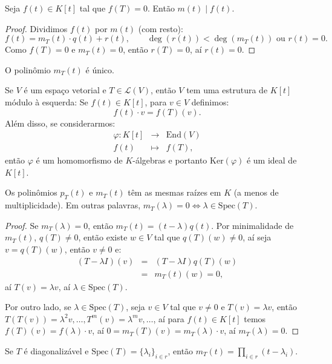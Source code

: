 \documentclass[11pt,twoside,a4paper]{book}
\begin{document}
\begin{lema}
Seja $f(t)\in K[t]$ tal que $f(T)=0$. Então $m(t)\mid f(t)$.
\end{lema}
\begin{proof}
Dividimos $f(t)$ por $m(t)$ (com resto):
\[
f(t)=m_T(t)\cdot q(t)+r(t),\quad\quad\deg(r(t))<\deg(m_T(t))\text{ ou }r(t)=0.
\]
Como $f(T)=0$ e $m_T(t)=0$, então $r(T)=0$, aí $r(t)=0$.
\end{proof}

\begin{corolario}
O polinômio $m_T(t)$ é único.
\end{corolario}

\noindent
Se $V$ é um espaço vetorial e $T\in\mathcal{L}(V)$, então $V$ tem uma estrutura de $K[t]$ módulo à esquerda: Se $f(t)\in K[t]$, para $v\in V$ definimos:
\[
f(t)\cdot v=f(T)(v).
\]
Além disso, se considerarmos:
\[
\begin{array}{rcl}
\varphi:K[t]&\rightarrow&\mathrm{End}(V)\\f(t)&\mapsto&f(T),
\end{array}
\]
então $\varphi$ é um homomorfismo de $K$-álgebras e portanto $\mathrm{Ker}(\varphi)$ é um ideal de $K[t]$.

\begin{teorema}
Os polinômios $p_T(t)$ e $m_T(t)$ têm as mesmas raízes em $K$ (a menos de multiplicidade). Em outras palavras, $m_T(\lambda)=0\Leftrightarrow\lambda\in\mathrm{Spec}(T)$.
\end{teorema}
\begin{proof}
Se $m_T(\lambda)=0$, então $m_T(t)=(t-\lambda)q(t)$. Por minimalidade de $m_T(t)$, $q(T)\neq 0$, então existe $w\in V$ tal que $q(T)(w)\neq 0$, aí seja $v=q(T)(w)$, então $v\neq 0$ e:
\[
\begin{array}{rcl}
(T-\lambda I)(v)&=&(T-\lambda I)q(T)(w)\\&=&m_T(t)(w)=0,
\end{array}
\]
aí $T(v)=\lambda v$, aí $\lambda\in\mathrm{Spec}(T)$.

\medskip
\noindent
Por outro lado, se $\lambda\in\mathrm{Spec}(T)$, seja $v\in V$ tal que $v\neq 0$ e $T(v)=\lambda v$, então $T(T(v))=\lambda^2 v,\dots,T^m(v)=\lambda^m v,\dots$, aí para $f(t)\in K[t]$ temos $f(T)(v)=f(\lambda)\cdot v$, aí $0=m_T(T)(v)=m_T(\lambda)\cdot v$, aí $m_T(\lambda)=0$.
\end{proof}

\begin{corolario}
Se $T$ é diagonalizável e $\mathrm{Spec}(T)=\{\lambda_i\}_{i\in r}$, então $m_T(t)=\prod_{i\in r}(t-\lambda_i)$.
\end{corolario}
\end{document}
